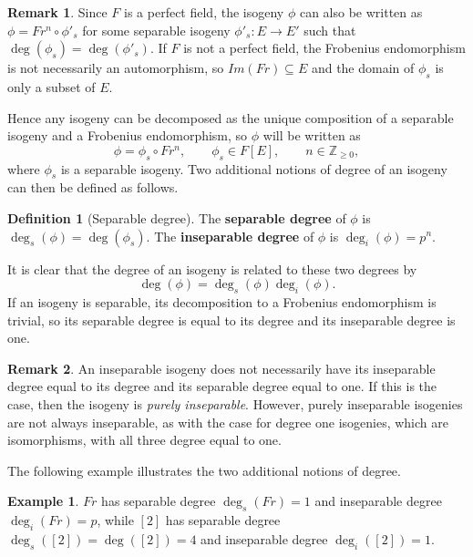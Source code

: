 \documentclass{article}
\newcommand{\Z}{\mathbb{Z}}
\newcommand{\rb}[1]{\left( #1 \right)}
\renewcommand{\sb}[1]{\left[ #1 \right]}
\theoremstyle{definition}
\newtheorem*{definition}{Definition}
\newtheorem*{example}{Example}
\newtheorem*{remark}{Remark}
\begin{document}
\begin{remark}
Since $ F $ is a perfect field, the isogeny $ \phi $ can also be written as $ \phi = Fr^n \circ \phi'_s $ for some separable isogeny $ \phi'_s : E \to E' $ such that $ \deg\rb{\phi_s} = \deg\rb{\phi'_s} $. If $ F $ is not a perfect field, the Frobenius endomorphism is not necessarily an automorphism, so $ Im\rb{Fr} \subseteq E $ and the domain of $ \phi_s $ is only a subset of $ E $.
\end{remark}

Hence any isogeny can be decomposed as the unique composition of a separable isogeny and a Frobenius endomorphism, so $ \phi $ will be written as
$$ \phi = \phi_s \circ Fr^n, \qquad \phi_s \in F\sb{E}, \qquad n \in \Z_{\ge 0}, $$
where $ \phi_s $ is a separable isogeny. Two additional notions of degree of an isogeny can then be defined as follows.

\begin{definition}[Separable degree]
The \textbf{separable degree} of $ \phi $ is $ \deg_s\rb{\phi} = \deg\rb{\phi_s} $. The \textbf{inseparable degree} of $ \phi $ is $ \deg_i\rb{\phi} = p^n $.
\end{definition}

It is clear that the degree of an isogeny is related to these two degrees by
$$ \deg\rb{\phi} = \deg_s\rb{\phi}\deg_i\rb{\phi}. $$
If an isogeny is separable, its decomposition to a Frobenius endomorphism is trivial, so its separable degree is equal to its degree and its inseparable degree is one.

\begin{remark}
An inseparable isogeny does not necessarily have its inseparable degree equal to its degree and its separable degree equal to one. If this is the case, then the isogeny is \emph{purely inseparable}. However, purely inseparable isogenies are not always inseparable, as with the case for degree one isogenies, which are isomorphisms, with all three degree equal to one.
\end{remark}

The following example illustrates the two additional notions of degree.

\begin{example}
$ Fr $ has separable degree $ \deg_s\rb{Fr} = 1 $ and inseparable degree $ \deg_i\rb{Fr} = p $, while $ \sb{2} $ has separable degree $ \deg_s\rb{\sb{2}} = \deg\rb{\sb{2}} = 4 $ and inseparable degree $ \deg_i\rb{\sb{2}} = 1 $.
\end{example}
\end{document}
